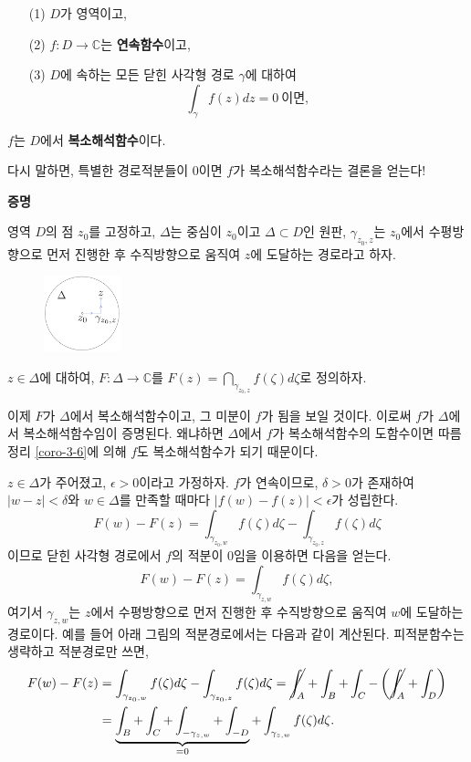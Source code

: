 
\begin{salttheorem}{}{} \label{thm-3-8}

\begin{itemize}
\item[(1)] $D$가 영역이고, 
\item[(2)] $f:D\to \mathbb C$는 \textbf{연속함수}이고,
\item[(3)] $D$에 속하는 모든 닫힌 사각형 경로 $\gamma$에 대하여
\[
\int_\gamma f(z)dz = 0 \ \text{이면},
\]
\end{itemize}
$f$는 $D$에서 \textbf{복소해석함수}이다.
\end{salttheorem}
다시 말하면, 특별한 경로적분들이 $0$이면
$f$가 복소해석함수라는 결론을 얻는다!

{\bf 증명}

영역 $D$의 점 $z_0$를 고정하고,
$\Delta$는 중심이 $z_0$이고 $\Delta \subset D$인 원판,
$\gamma_{z_0,z}$는 $z_0$에서 수평방향으로 먼저 진행한 후
수직방향으로 움직여 $z$에 도달하는 경로라고 하자.
\begin{figure}[h!]
\begin{center}
\includegraphics[width=0.2\textwidth]{./SaltChapter/figs/fig-3-0-12}
\end{center}
\end{figure}

$z\in\Delta$에 대하여,
$F:\Delta \to \mathbb C$를 $F(z) = \dint_{\gamma_{z_0,z}} f(\zeta)d\zeta$로
정의하자.

이제 $F$가 $\Delta$에서 복소해석함수이고, 그 미분이 $f$가 됨을 보일 것이다.
이로써 $f$가 $\Delta$에서 복소해석함수임이 증명된다. 왜냐하면
$\Delta$에서 $f$가 복소해석함수의 도함수이면 따름정리 \ref{coro-3-6}에 의해
$f$도 복소해석함수가 되기 때문이다.

$z\in \Delta$가 주어졌고, $\epsilon>0$이라고 가정하자.
$f$가 연속이므로, $\delta>0$가 존재하여
$|w-z|<\delta$와 $w\in \Delta$를 만족할 때마다
$|f(w) - f(z)| <\epsilon$가 성립한다.
\[
F(w) - F(z) = \int_{\gamma_{z_0,w}} f(\zeta) d\zeta
- \int_{\gamma_{z_0,z}} f(\zeta) d\zeta
\]
이므로
닫힌 사각형 경로에서 $f$의 적분이 $0$임을 이용하면 다음을 얻는다.
\[
F(w) - F(z) = \int_{\gamma_{z,w}} f(\zeta) d\zeta,
\]
여기서 $\gamma_{z,w}$는 $z$에서 수평방향으로 먼저 진행한 후
수직방향으로 움직여 $w$에 도달하는 경로이다.
예를 들어 아래 그림의 적분경로에서는 다음과 같이 계산된다. 
피적분함수는 생략하고 적분경로만 쓰면,
\begin{align*}
F(w) - F(z) 
&= \int_{\gamma_{z_0,w}} f(\zeta) d\zeta
- \int_{\gamma_{z_0,z}} f(\zeta) d\zeta
= \cancel{\int_A} + \int_B + \int_C - \left(\cancel{\int_A} + \int_D \right) \\
&= \underbrace{\int_B + \int_C + \int_{-\gamma_{z,w}} + \int_{-D}}_{=0}
+\int_{\gamma_{z,w}} f(\zeta) d\zeta.
\end{align*}

